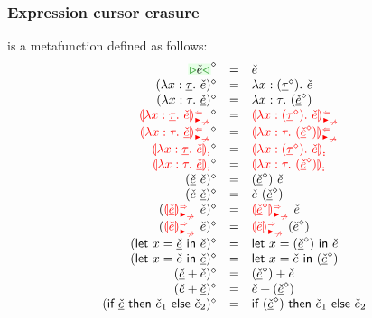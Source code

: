 \documentclass[formalism.tex]{subfiles}
\begin{document}
\subsubsection{Expression cursor erasure}
\label{sec:typed-expression-cursor-erasure}
\judgbox{\ensuremath{\cursorErase{\ZCMV}}} is a metafunction defined as follows:
%
\newcommand{\cursorErasesToRow}[2]{\ensuremath{\cursorErase{#1} & = & #2}}
\[\begin{array}{rcl}
  \cursorErasesToRow{\ZCCursor{\ECMV}}{\ECMV} \\
  \cursorErasesToRow{(\ZCLamT{x}{\ZTMV}{\ECMV})}{\ECLam{x}{(\cursorErase{\ZTMV})}{\ECMV}} \\
  \cursorErasesToRow{(\ZCLamE{x}{\TMV}{\ZCMV})}{\ECLam{x}{\TMV}{(\cursorErase{\ZCMV})}} \\
  \cursorErasesToRow{\ZCLamAnaNonMatchedArrowT{x}{\ZTMV}{\ECMV}}{\ECLamAnaNonMatchedArrow{x}{(\cursorErase{\ZTMV})}{\ECMV}} \\
  \cursorErasesToRow{\ZCLamAnaNonMatchedArrowE{x}{\TMV}{\ZCMV}}{\ECLamAnaNonMatchedArrow{x}{\TMV}{(\cursorErase{\ZCMV})}} \\
  \cursorErasesToRow{\ZCLamInconAscT{x}{\ZTMV}{\ECMV}}{\ECLamInconAsc{x}{(\cursorErase{\ZTMV})}{\ECMV}} \\
  \cursorErasesToRow{\ZCLamInconAscE{x}{\TMV}{\ZCMV}}{\ECLamInconAsc{x}{\TMV}{(\cursorErase{\ZCMV})}} \\
  \cursorErasesToRow{(\ZCApL{\ZCMV}{\ECMV})}{\ECAp{(\cursorErase{\ZCMV})}{\ECMV}} \\
  \cursorErasesToRow{(\ZCApR{\ECMV}{\ZCMV})}{\ECAp{\ECMV}{(\cursorErase{\ZCMV})}} \\
  \cursorErasesToRow{(\ZCApSynNonMatchedArrowL{\ZCMV}{\ECMV})}{\ECApSynNonMatchedArrow{\cursorErase{\ZCMV}}{\ECMV}} \\
  \cursorErasesToRow{(\ZCApSynNonMatchedArrowR{\ECMV}{\ZCMV})}{\ECApSynNonMatchedArrow{\ECMV}{(\cursorErase{\ZCMV})}} \\
  \cursorErasesToRow{(\ZCLetL{x}{\ZCMV}{\ECMV})}{\ECLet{x}{(\cursorErase{\ZCMV})}{\ECMV}} \\
  \cursorErasesToRow{(\ZCLetR{x}{\ECMV}{\ZCMV})}{\ECLet{x}{\ECMV}{(\cursorErase{\ZCMV})}} \\
  \cursorErasesToRow{(\ZCPlusL{\ZCMV}{\ECMV})}{\ECPlus{(\cursorErase{\ZCMV})}{\ECMV}} \\
  \cursorErasesToRow{(\ZCPlusR{\ECMV}{\ZCMV})}{\ECPlus{\ECMV}{(\cursorErase{\ZCMV})}} \\
  \cursorErasesToRow{(\ZCIfC{\ZCMV}{\ECMV_1}{\ECMV_2})}{\ECIf{(\cursorErase{\ZCMV})}{\ECMV_1}{\ECMV_2}} \\

\end{array}\]
\end{document}
